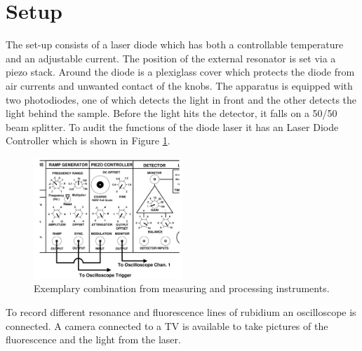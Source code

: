 \section{Setup}
\label{sec:setup}

The set-up consists of a laser diode which has both a controllable temperature and an adjustable current.
The position of the external resonator is set via a piezo stack.
Around the diode is a plexiglass cover which protects the diode from air currents and unwanted contact of the knobs.
The apparatus is equipped with two photodiodes, one of which detects the light in front and the other detects the light behind the sample.
Before the light hits the detector, it falls on a 50/50 beam splitter.
To audit the functions of the diode laser it has an Laser Diode Controller which is shown in Figure \ref{fig:contr}.
\begin{figure}[H] 
    \centering
    \includegraphics[width=0.5\textwidth]{content/graphics/controller.jpg}
    \caption{Exemplary combination from measuring and processing instruments. \cite{diode_laser}} %
    \label{fig:contr} 
\end{figure}
To record different resonance and fluorescence lines of rubidium an oscilloscope is connected. 
A camera connected to a TV is available to take pictures of the fluorescence and the light from the laser.
